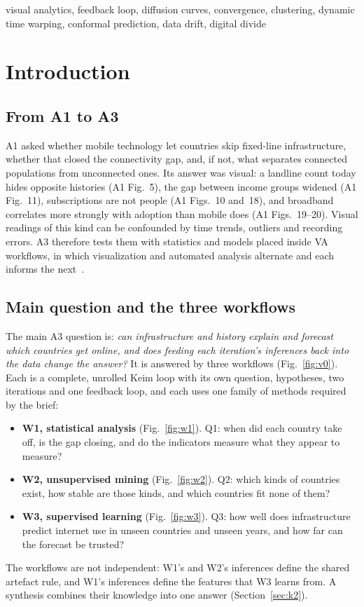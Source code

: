 \documentclass[conference,a4paper]{IEEEtran}
\begin{document}
\begin{IEEEkeywords}
visual analytics, feedback loop, diffusion curves, convergence, clustering, dynamic time warping,
conformal prediction, data drift, digital divide
\end{IEEEkeywords}

\section{Introduction}
\subsection{From A1 to A3}
A1 asked whether mobile technology let countries skip fixed-line infrastructure, whether that
closed the connectivity gap, and, if not, what separates connected populations from unconnected
ones. Its answer was visual: a landline count today hides opposite histories (A1 Fig.~5), the gap
between income groups widened (A1 Fig.~11), subscriptions are not people (A1 Figs.~10 and~18), and
broadband correlates more strongly with adoption than mobile does (A1 Figs.~19--20). Visual
readings of this kind can be confounded by time trends, outliers and recording errors. A3 therefore
tests them with statistics and models placed inside VA workflows, in which visualization and
automated analysis alternate and each informs the next~\cite{keim2008challenges,card1999,sacha2014}.

\subsection{Main question and the three workflows}
The main A3 question is: \emph{can infrastructure and history explain and forecast which countries
get online, and does feeding each iteration's inferences back into the data change the answer?} It
is answered by three workflows (Fig.~\ref{fig:v0}). Each is a complete, unrolled Keim loop with its
own question, hypotheses, two iterations and one feedback loop, and each uses one family of methods
required by the brief:
\begin{itemize}
\item \textbf{W1, statistical analysis} (Fig.~\ref{fig:w1}). Q1: when did each country take off, is
  the gap closing, and do the indicators measure what they appear to measure?
\item \textbf{W2, unsupervised mining} (Fig.~\ref{fig:w2}). Q2: which kinds of countries exist, how
  stable are those kinds, and which countries fit none of them?
\item \textbf{W3, supervised learning} (Fig.~\ref{fig:w3}). Q3: how well does infrastructure predict
  internet use in unseen countries and unseen years, and how far can the forecast be trusted?
\end{itemize}
The workflows are not independent: W1's and W2's inferences define the shared artefact rule, and W1's
inferences define the features that W3 learns from. A synthesis combines their knowledge into one
answer (Section~\ref{sec:k2}).
\end{document}
